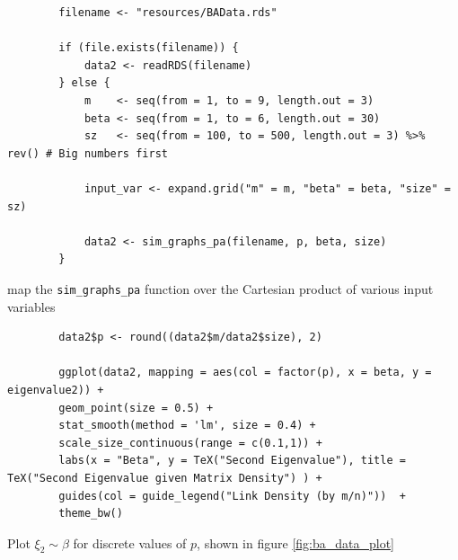 \documentclass[11pt]{report}
\begin{document}
\begin{listing}[htbp]
    \begin{tcolorbox}
        \begin{verbatim}
        filename <- "resources/BAData.rds"

        if (file.exists(filename)) {
            data2 <- readRDS(filename)
        } else {
            m    <- seq(from = 1, to = 9, length.out = 3)
            beta <- seq(from = 1, to = 6, length.out = 30)
            sz   <- seq(from = 100, to = 500, length.out = 3) %>% rev() # Big numbers first

            input_var <- expand.grid("m" = m, "beta" = beta, "size" = sz)

            data2 <- sim_graphs_pa(filename, p, beta, size)
        }
        \end{verbatim}
    \end{tcolorbox}
 \caption{\label{l:gen_ba_data} map the \texttt{sim\_graphs\_pa} function over the Cartesian product of various input variables}
\end{listing}

\begin{listing}[htbp]
    \begin{tcolorbox}
        \begin{verbatim}
        data2$p <- round((data2$m/data2$size), 2)

        ggplot(data2, mapping = aes(col = factor(p), x = beta, y = eigenvalue2)) +
        geom_point(size = 0.5) +
        stat_smooth(method = 'lm', size = 0.4) +
        scale_size_continuous(range = c(0.1,1)) +
        labs(x = "Beta", y = TeX("Second Eigenvalue"), title = TeX("Second Eigenvalue given Matrix Density") ) +
        guides(col = guide_legend("Link Density (by m/n)"))  +
        theme_bw()
        \end{verbatim}
    \end{tcolorbox}
\caption{\label{l:ba_data_plot} Plot \(\xi_{2} \sim \beta\) for discrete values of \(p\), shown in figure \ref{fig:ba_data_plot} }
\end{listing}
\end{document}
